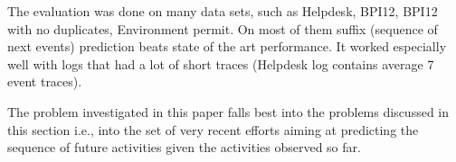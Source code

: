 The evaluation was done on many data sets, such as Helpdesk, BPI12, BPI12 with no duplicates, Environment permit. On most of them suffix (sequence of next events) prediction beats state of the art performance. It worked especially well with logs that had a lot of short traces (Helpdesk log contains average 7 event traces).

The problem investigated in this paper falls best into the problems discussed in this section i.e., into the set of very recent efforts aiming at predicting the sequence of future activities given the activities observed so far.



%
%
%


